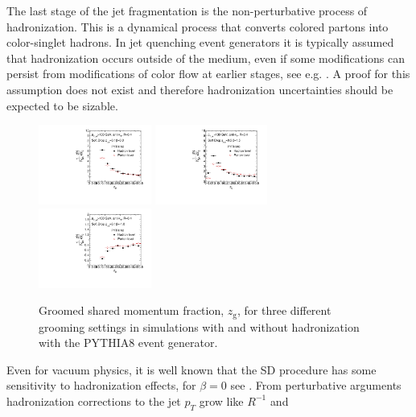 The last stage of the jet fragmentation is the non-perturbative process of hadronization. This is a dynamical process that converts colored partons into color-singlet hadrons. In jet quenching event generators it is typically assumed that hadronization occurs outside of the medium, even if some modifications can persist from modifications of color flow at earlier stages, see e.g. \cite{Aurenche:2011rd,Beraudo:2011bh,Beraudo:2012bq}. A proof for this assumption does not exist and therefore hadronization uncertainties should be expected to be sizable. 

\begin{figure}[th]
\centering
\includegraphics[width=0.33\textwidth]{figures/SDGen/ZgPytHadVsPartBeta00Z01.pdf}%
\includegraphics[width=0.33\textwidth]{figures/SDGen/ZgPytHadVsPartBeta15Z05.pdf}%
\includegraphics[width=0.33\textwidth]{figures/SDGen/ZgPytHadVsPartBetam1Z01.pdf}%
\caption{Groomed shared momentum fraction, $z_{\mathrm{g}}$, for three different grooming settings in simulations with and without hadronization with the PYTHIA8 event generator.}
\label{fig:SDGenZGHadVsPart}
\end{figure}
Even for vacuum physics, it is well known that the SD procedure has some sensitivity to hadronization effects, for $\beta = 0$ see \cite{Dasgupta:2015yua}.
From perturbative arguments hadronization corrections to the jet $p_{T}$ grow like $R^{-1}$ \cite{Dasgupta:2007wa} and
